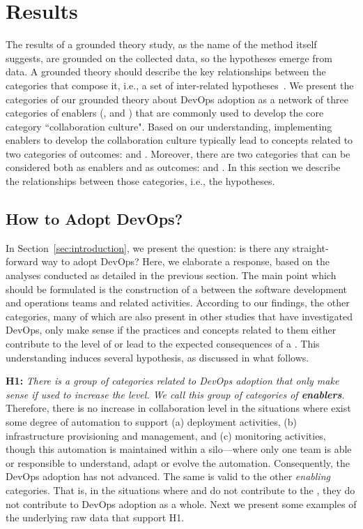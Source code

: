 \section{Results} \label{sec:results}

The results of a grounded theory study, as the name of the method itself
suggests, are grounded on the collected data, so the hypotheses emerge from
data. A grounded theory should describe the key relationships between the
categories that compose it, i.e., a set of inter-related hypotheses~\cite{hoda2017becoming}.
We present the categories of our grounded theory
about DevOps adoption as a network of three categories of enablers (,
 and ) that are commonly used to develop the core category
``collaboration culture". Based on our understanding, implementing enablers to develop the collaboration
culture typically lead to concepts related to two categories of outcomes:
 and . Moreover, there are two categories that can be considered
both as enablers and as outcomes:  and .
In this section we describe the relationships between those categories, i.e.,
the hypotheses.

\subsection{How to Adopt DevOps?}

In Section~\ref{sec:introduction}, we present the question: is there any
straight-forward way to adopt DevOps? Here, we elaborate a response,
based on the analyses conducted as detailed in the previous section. The main
point which should be formulated is the construction of a  between the software development and operations teams and 
related activities. According to our findings, the other categories, 
many of which are also present in other studies that have investigated DevOps, 
only make sense if the practices and
concepts related to them either contribute to the level of  or lead to the expected consequences of a . This understanding induces several hypothesis, as discussed in 
what follows. 

\textbf{H1:} \textit{There is a group of categories related to DevOps adoption
that only make sense if used to increase the  level. We
call this group of categories of \textbf{enablers}}. Therefore, there is no increase in collaboration 
level in the situations 
where exist some degree of
automation to support (a) deployment activities, (b) infrastructure provisioning and management, 
and (c) monitoring activities, though this automation is maintained within a silo---where
only one team is able or responsible to understand, adapt or
evolve the automation. Consequently, the DevOps adoption has not advanced. The same is valid to the
other \emph{enabling} categories. That is, in the situations where 
 and  do not contribute to
the , they do not contribute to DevOps adoption as a whole. Next
we present some examples of the underlying raw data that support H1. 

